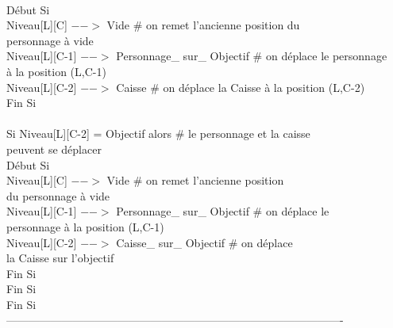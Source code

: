 \documentclass{article}
\begin{document}
\begin{tabbing}
\\	\hspace{4cm}	Début Si
\\	\hspace{5cm}		Niveau[L][C] $-->$ Vide 				\# on remet l'ancienne position du 
\\ \hspace{5cm} personnage à vide
\\	\hspace{5cm}		Niveau[L][C-1] $-->$ Personnage\_ sur\_ Objectif	\# on déplace le personnage 
\\ \hspace{5cm} à la position (L,C-1)
\\	\hspace{5cm}		Niveau[L][C-2] $-->$ Caisse			\# on déplace la Caisse à la position (L,C-2)
\\	\hspace{4cm}	Fin Si
\\
\\	\hspace{4cm}	Si Niveau[L][C-2] = Objectif alors         		\# le personnage et la caisse
\\ \hspace{4cm} peuvent se déplacer
\\	\hspace{4cm}	Début Si
\\	\hspace{5cm}		Niveau[L][C] $-->$ Vide 				\# on remet l'ancienne position
\\ \hspace{5cm} du personnage à vide
\\	\hspace{5cm}		Niveau[L][C-1] $-->$ Personnage\_ sur\_ Objectif	\# on déplace le
\\ \hspace{5cm} personnage à la position (L,C-1)
\\	\hspace{5cm}		Niveau[L][C-2] $-->$ Caisse\_ sur\_ Objectif		\# on déplace 
\\ \hspace{5cm} la Caisse sur l'objectif
\\	\hspace{4cm}	Fin Si
\\	\hspace{3cm}  Fin Si  
\\	\hspace{2cm}  Fin Si 
\\	-------------------------------------------------------------------------------------------

\end{tabbing}
\end{document}
